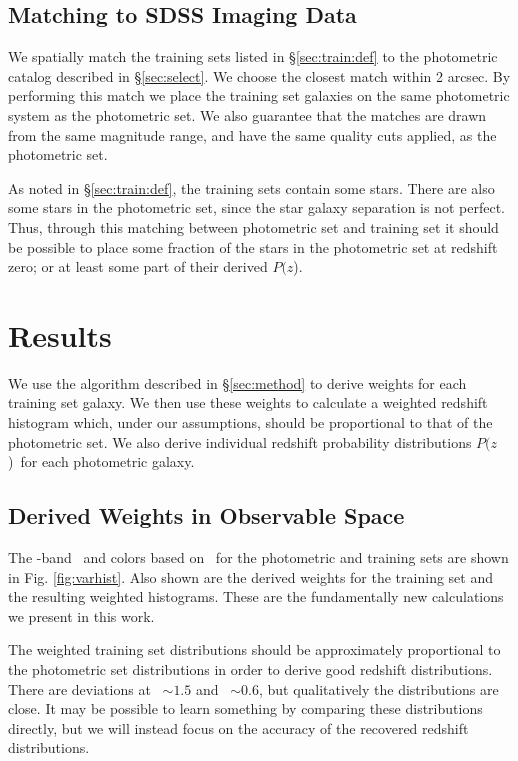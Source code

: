 \documentclass[preprint]{aastex}
\newcommand{\pofz}{$P(z$)}
\newcommand{\matchrad}{2 arcsec}
\begin{document}
\subsection{Matching to SDSS Imaging Data} \label{sec:train:match}

We spatially match the training sets listed in \S \ref{sec:train:def} to the
photometric catalog described in \S \ref{sec:select}.  We choose the closest
match within \matchrad.  By performing this match we place the training set
galaxies on the same photometric system as the photometric set.  We also
guarantee that the matches are drawn from the same magnitude range, and have
the same quality cuts applied, as the photometric set.

As noted in \S \ref{sec:train:def}, the training sets contain some stars.
There are also some stars in the photometric set, since the star galaxy
separation is not perfect.  Thus, through this matching between photometric set
and training set it should be possible to place some fraction of the stars in
the photometric set at redshift zero; or at least some part of their derived
\pofz.

\section{Results} \label{sec:results}

We use the algorithm described in \S \ref{sec:method} to derive weights for
each training set galaxy.  We then use these weights to calculate a weighted
redshift histogram which, under our assumptions, should be proportional to that
of the photometric set.  We also derive individual redshift probability
distributions \pofz\ for each photometric galaxy.

\subsection{Derived Weights in Observable Space}

The \rmag-band \cmodelmag\ and colors based on \modelmag\ for the photometric
and training sets are shown in Fig. \ref{fig:varhist}.  Also shown are the
derived weights for the training set and the resulting weighted histograms.
These are the fundamentally new calculations we present in this work.

The weighted training set distributions should be approximately proportional to
the photometric set distributions in order to derive good redshift
distributions.  There are deviations at \gmr\ $\sim 1.5$ and \rmi\ $\sim 0.6$,
but qualitatively the distributions are close.  It may be possible to learn
something by comparing these distributions directly, but we will instead focus
on the accuracy of the recovered redshift distributions.
\end{document}
